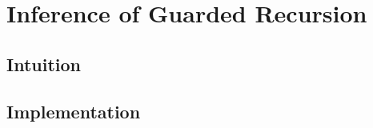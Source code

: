 \chapter{Inference of Guarded Recursion}
\label{cha:infer-guard-recurs}

\section{Intuition}

\section{Implementation}

